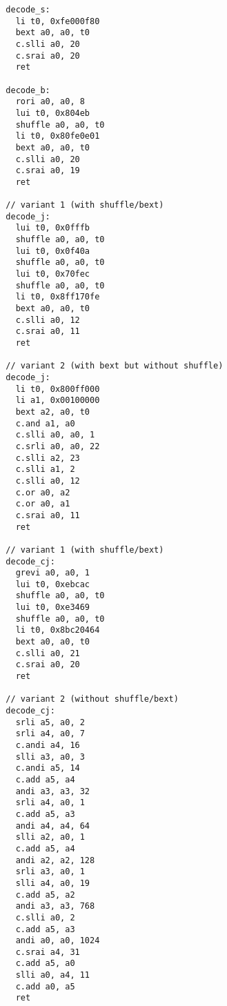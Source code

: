 \begin{verbatim}
  decode_s:
    li t0, 0xfe000f80
    bext a0, a0, t0
    c.slli a0, 20
    c.srai a0, 20
    ret

  decode_b:
    rori a0, a0, 8
    lui t0, 0x804eb
    shuffle a0, a0, t0
    li t0, 0x80fe0e01
    bext a0, a0, t0
    c.slli a0, 20
    c.srai a0, 19
    ret

  // variant 1 (with shuffle/bext)
  decode_j:
    lui t0, 0x0fffb
    shuffle a0, a0, t0
    lui t0, 0x0f40a
    shuffle a0, a0, t0
    lui t0, 0x70fec
    shuffle a0, a0, t0
    li t0, 0x8ff170fe
    bext a0, a0, t0
    c.slli a0, 12
    c.srai a0, 11
    ret

  // variant 2 (with bext but without shuffle)
  decode_j:
    li t0, 0x800ff000
    li a1, 0x00100000
    bext a2, a0, t0
    c.and a1, a0
    c.slli a0, a0, 1
    c.srli a0, a0, 22
    c.slli a2, 23
    c.slli a1, 2
    c.slli a0, 12
    c.or a0, a2
    c.or a0, a1
    c.srai a0, 11
    ret

  // variant 1 (with shuffle/bext)
  decode_cj:
    grevi a0, a0, 1
    lui t0, 0xebcac
    shuffle a0, a0, t0
    lui t0, 0xe3469
    shuffle a0, a0, t0
    li t0, 0x8bc20464
    bext a0, a0, t0
    c.slli a0, 21
    c.srai a0, 20
    ret

  // variant 2 (without shuffle/bext)
  decode_cj:
    srli a5, a0, 2
    srli a4, a0, 7
    c.andi a4, 16
    slli a3, a0, 3
    c.andi a5, 14
    c.add a5, a4
    andi a3, a3, 32
    srli a4, a0, 1
    c.add a5, a3
    andi a4, a4, 64
    slli a2, a0, 1
    c.add a5, a4
    andi a2, a2, 128
    srli a3, a0, 1
    slli a4, a0, 19
    c.add a5, a2
    andi a3, a3, 768
    c.slli a0, 2
    c.add a5, a3
    andi a0, a0, 1024
    c.srai a4, 31
    c.add a5, a0
    slli a0, a4, 11
    c.add a0, a5
    ret
\end{verbatim}

